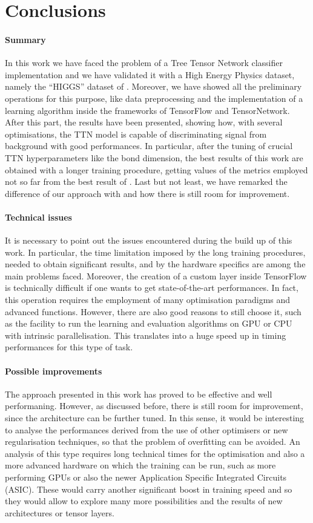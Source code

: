 \documentclass[../main/main.tex]{subfiles}
\begin{document}
\section{Conclusions}

\paragraph{Summary}
In this work we have faced the problem of a Tree Tensor Network classifier implementation and we have validated it with a High Energy Physics dataset, namely the ``HIGGS'' dataset of \cite{baldi}. Moreover, we have showed all the preliminary operations for this purpose, like data preprocessing and the implementation of a learning algorithm inside the frameworks of TensorFlow and TensorNetwork. After this part, the results have been presented, showing how, with several optimisations, the TTN model is capable of discriminating signal from background with good performances. In particular, after the tuning of crucial TTN hyperparameters like the bond dimension, the best results of this work are obtained with a longer training procedure, getting values of the metrics employed not so far from the best result of \cite{baldi}. Last but not least, we have remarked the difference of our approach with \cite{baldi} and how there is still room for improvement.


\paragraph{Technical issues}
It is necessary to point out the issues encountered during the build up of this work. In particular, the time limitation imposed by the long training procedures, needed to obtain significant results, and by the hardware specifics are among the main problems faced. Moreover, the creation of a custom layer inside TensorFlow is technically difficult if one wants to get state-of-the-art performances. In fact, this operation requires the employment of many optimisation paradigms and advanced functions. However, there are also good reasons to still choose it, such as the facility to run the learning and evaluation algorithms on GPU or CPU with intrinsic parallelisation. This translates into a huge speed up in timing performances for this type of task.


\paragraph{Possible improvements}
The approach presented in this work has proved to be effective and well performaning. However, as discussed before, there is still room for improvement, since the architecture can be further tuned. In this sense, it would be interesting to analyse the performances derived from the use of other optimisers or new regularisation techniques, so that the problem of overfitting can be avoided. An analysis of this type requires long technical times for the optimisation and also a more advanced hardware on which the training can be run, such as more performing GPUs or also the newer Application Specific Integrated Circuits (ASIC). These would carry another significant boost in training speed and so they would allow to explore many more possibilities and the results of new architectures or tensor layers.
\end{document}
